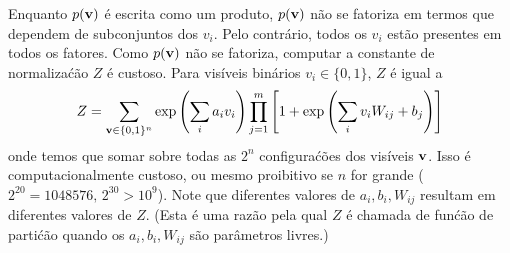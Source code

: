 \begin{exenumerate}
\begin{solution}
        Enquanto $p(\mathbf{v})$ \'e escrita como um produto, $p(\mathbf{v})$ n\~ao
        se fatoriza em termos que dependem de subconjuntos dos
        $v_i$. Pelo contr\'ario, todos os $v_i$ est\~ao presentes em todos os
        fatores. Como $p(\mathbf{v})$ n\~ao se fatoriza, computar a constante de
        normaliza\'c\~ao $Z$ \'e custoso. Para vis\'iveis bin\'arios
        $v_i \in \{0,1\}$, $Z$ \'e igual a
        \begin{equation}
            Z = \sum_{\mathbf{v} \in \{0,1\}^n} \exp\left( \sum_i a_i v_i \right) \prod_{j=1}^m \left[1+ \exp\left(\sum_i v_i W_{ij} + b_j \right)\right]
        \end{equation}
        onde temos que somar sobre todas as $2^n$ configura\'c\~oes dos
        vis\'iveis $\mathbf{v}$. Isso \'e computacionalmente custoso, ou mesmo
        proibitivo se $n$ for grande ($2^{20} = 1048576,\, 2^{30}>
        10^9$). Note que diferentes valores de $a_i,b_i,W_{ij}$ resultam em
        diferentes valores de $Z$. (Esta \'e uma raz\~ao pela qual $Z$ \'e chamada de
        fun\'c\~ao de parti\'c\~ao quando os $a_i, b_i, W_{ij}$ s\~ao par\^ametros livres.)
        

\end{solution}
\end{exenumerate}
